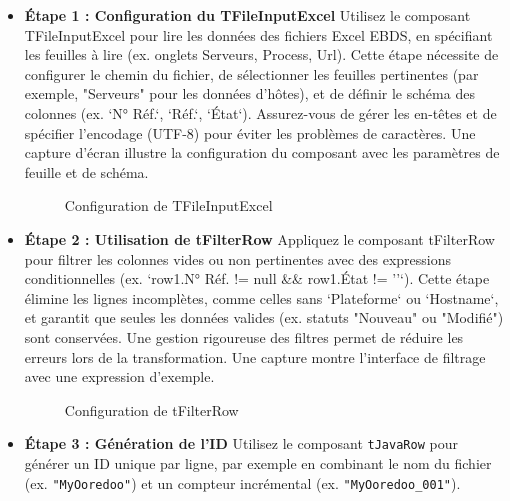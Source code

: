 \begin{itemize}
    \item \textbf{Étape 1 : Configuration du TFileInputExcel}  
      Utilisez le composant TFileInputExcel pour lire les données des fichiers Excel EBDS, en spécifiant les feuilles à lire (ex. onglets Serveurs, Process, Url). Cette étape nécessite de configurer le chemin du fichier, de sélectionner les feuilles pertinentes (par exemple, "Serveurs" pour les données d'hôtes), et de définir le schéma des colonnes (ex. `N° Réf.`, `Réf.`, `État`). Assurez-vous de gérer les en-têtes et de spécifier l'encodage (UTF-8) pour éviter les problèmes de caractères. Une capture d’écran illustre la configuration du composant avec les paramètres de feuille et de schéma.
      
      \begin{figure}[h]
          \centering
          \caption{Configuration de TFileInputExcel}
          \label{fig:etl_step1}
      \end{figure}
      
    \item \textbf{Étape 2 : Utilisation de tFilterRow}  
      Appliquez le composant tFilterRow pour filtrer les colonnes vides ou non pertinentes avec des expressions conditionnelles (ex. `row1.N° Réf. != null && row1.État != ''`). Cette étape élimine les lignes incomplètes, comme celles sans `Plateforme` ou `Hostname`, et garantit que seules les données valides (ex. statuts "Nouveau" ou "Modifié") sont conservées. Une gestion rigoureuse des filtres permet de réduire les erreurs lors de la transformation. Une capture montre l’interface de filtrage avec une expression d’exemple.
      
      \begin{figure}[h]
          \centering
          \caption{Configuration de tFilterRow}
          \label{fig:etl_step2}
      \end{figure}
      \newpa
   \item \textbf{Étape 3 : Génération de l'ID}  
Utilisez le composant \texttt{tJavaRow} pour générer un ID unique par ligne, par exemple en combinant le nom du fichier (ex. \texttt{"MyOoredoo"}) et un compteur incrémental (ex. \texttt{"MyOoredoo\_001"}).

\vspace{2mm}


\end{itemize}
